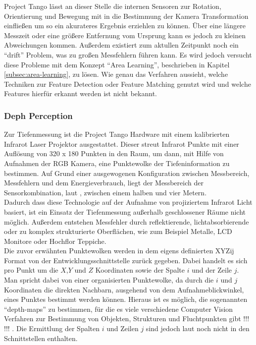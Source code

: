 Project Tango lässt an dieser Stelle die internen Sensoren zur Rotation, Orientierung und Bewegung mit in die Bestimmung der Kamera Transformation einfließen um so ein akurateres Ergebnis erziehlen zu können. Über eine längere Messzeit oder eine größere Entfernung vom Ursprung kann es jedoch zu kleinen Abweichungen kommen. Außerdem existiert zum aktullen Zeitpunkt noch ein \enquote{drift} Problem, was zu großen Messfehlern führen kann. Es wird jedoch versucht diese Probleme mit dem Konzept \enquote{Area Learning}, beschrieben in Kapitel \ref{subsec:area-learning}, zu lösen. \citep{GoogleDevelopersConcepts:online}
Wie genau das Verfahren aussieht, welche Techniken zur Feature Detection oder Feature Matching genutzt wird und welche Features hierfür erkannt werden ist nicht bekannt.  \\

\subsubsection{Deph Perception}

Zur Tiefenmessung ist die Project Tango Hardware mit einem kalibrierten Infrarot Laser Projektor ausgestattet. Dieser streut Infrarot Punkte mit einer Auflösung von 320 x 180 Punkten in den Raum, um dann, mit Hilfe von Aufnahmen der RGB Kamera, eine Punktewolke der Tiefeninformation zu bestimmen. Auf Grund einer ausgewogenen Konfiguration zwischen Messbereich, Messfehlern und dem Energieverbrauch, liegt der Messbereich der Sensorkombination, laut \citet{GoogleDevelopersConcepts:online}, zwischen einem halben und vier Metern. \\

Dadurch dass diese Technologie auf der Aufnahme von projiziertem Infrarot Licht basiert, ist ein Einsatz der Tiefenmessung außerhalb geschlossener Räume nicht möglich. \citep{GoogleDevelopersConcepts:online} Außerdem entstehen Messfehler durch reflektierende,  lichtabsorbierende oder zu komplex strukturierte Oberflächen, wie zum Beispiel Metalle, LCD Monitore oder Hochflor Teppiche. \\

Die zuvor erwähnten Punktewolken werden in dem eigens definierten XYZij Format von der Entwicklungsschnittstelle zurück gegeben. Dabei handelt es sich pro Punkt um die \(X\),\(Y\) und \(Z\) Koordinaten sowie der Spalte \(i \) und der Zeile \(j\). \citep{GoogleDevelopersConcepts:online} Man spricht dabei von einer organisierten Punktewolke, da durch die \(i\) und \(j\) Koordinaten die direkten Nachbarn, ausgehend von dem Aufnahmeblickwinkel, eines Punktes bestimmt werden können. Hieraus ist es möglich, die sogenannten \enquote{depth-maps} zu bestimmen, für die es viele verschiedene Computer Vision Verfahren zur Bestimmung von Objekten, Strukturen und Fluchtpunkten gibt !!! !!! . Die Ermittlung der Spalten \(i\) und Zeilen \(j\) sind jedoch laut \citet{GoogleDevelopersKnownIssues:online} noch nicht in den Schnittstellen enthalten.\\ 


